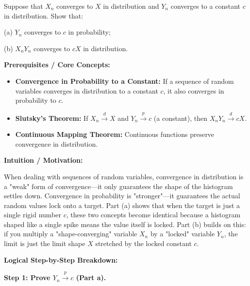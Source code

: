 \begin{exercise}\label{probability:2014:6}
Suppose that $X_n$ converges to $X$ in distribution and $Y_n$ converges to a constant $c$ in distribution. Show that:

(a) $Y_n$ converges to $c$ in probability;

(b) $X_n Y_n$ converges to $cX$ in distribution.
\end{exercise}

\begin{solution}
\textbf{Prerequisites / Core Concepts:}
\begin{itemize}
    \item \textbf{Convergence in Probability to a Constant:} If a sequence of random variables converges in distribution to a constant $c$, it also converges in probability to $c$.
    \item \textbf{Slutsky's Theorem:} If $X_n \xrightarrow{d} X$ and $Y_n \xrightarrow{p} c$ (a constant), then $X_n Y_n \xrightarrow{d} cX$.
    \item \textbf{Continuous Mapping Theorem:} Continuous functions preserve convergence in distribution.
\end{itemize}

\textbf{Intuition / Motivation:}

When dealing with sequences of random variables, convergence in distribution is a "weak" form of convergence—it only guarantees the shape of the histogram settles down. Convergence in probability is "stronger"—it guarantees the actual random values lock onto a target. Part (a) shows that when the target is just a single rigid number $c$, these two concepts become identical because a histogram shaped like a single spike means the value itself is locked. Part (b) builds on this: if you multiply a "shape-converging" variable $X_n$ by a "locked" variable $Y_n$, the limit is just the limit shape $X$ stretched by the locked constant $c$.

\textbf{Logical Step-by-Step Breakdown:}

\textbf{Step 1: Prove $Y_n \xrightarrow{p} c$ (Part a).}


\end{solution}
